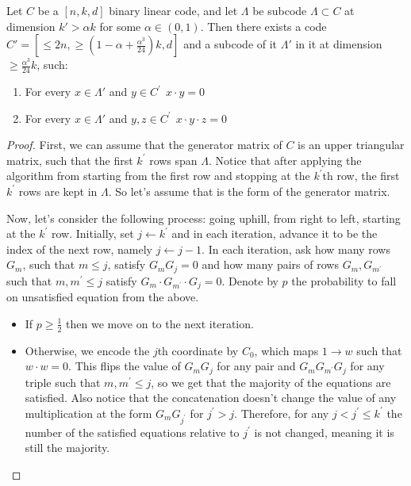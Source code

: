 \documentclass[manuscript,screen,review]{acmart}
\begin{document}
\begin{claim} 
  \label{claim:commute}
  Let $C$ be a $[n,k,d]$ binary linear code, and let $\Lambda$ be subcode $\Lambda \subset C$ at dimension $k' > \alpha k$ for some $\alpha\in(0,1)$. Then there exists a code $C' = [\leq 2n, \geq (1 - \alpha + \frac{\alpha^{3}}{24})k, d]$ and a subcode of it $\Lambda' $ in it at dimension $\ge \frac{\alpha^{3}}{24}k$, such:
  \begin{enumerate}
      \label{property:prop}
    \item For every $x \in \Lambda'$ and $y \in C^{\prime} \ \ x\cdot y = 0$
    \item For every $x \in \Lambda'$ and $y,z \in C^{\prime} \ \ x \cdot y \cdot z =0 $
  \end{enumerate}
\end{claim}
\begin{proof} 
  First, we can assume that the generator matrix of $C$ is an upper triangular matrix, such that the first $k^\prime$ rows span $\Lambda$. Notice that after applying the algorithm from  starting from the first row and stopping at the $k^{\prime}$th row, the first $k^{\prime}$ rows are kept in $\Lambda$. So let's assume that is the form of the generator matrix. 

  
  Now, let's consider the following process: going uphill, from right to left, starting at the $k^\prime$ row. Initially, set $j \leftarrow k^{\prime}$ and in each iteration, advance it to be the index of the next row, namely $j\leftarrow j - 1$. In each iteration, ask how many rows $G_{m}$, such that $m \le j$, satisfy $G_{m} G_{j} = 0$ and how many pairs of rows $G_{m},G_{m^{\prime}}$ such that $m,m^{\prime}\le j$ satisfy $G_{m}\cdot G_{m^{\prime}} \cdot G_{j} = 0$. Denote by $p$ the probability to fall on unsatisfied equation from the above.  
  \begin{itemize}
    \item If $p \ge \frac{1}{2}$ then we move on to the next iteration. 
    \item Otherwise, we encode the $j$th coordinate by $C_{0}$, which maps $1 \rightarrow w$ such that $w\cdot w = 0$. This flips the value of $G_{m} G_{j}$ for any pair and $G_{m} G_{m^{\prime}} G_{j}$ for any triple such that $m,m^{\prime} \le j$, so we get that the majority of the equations are satisfied. Also notice that the concatenation doesn't change the value of any multiplication at the form $G_{m}G_{j^{\prime}}$ for $j^{\prime}> j$. Therefore, for any $j< j^{\prime}\le k^{\prime}$ the number of the satisfied equations relative to $j^{\prime}$ is not changed, meaning it is still the majority.


\end{itemize}
\end{proof}
\end{document}
